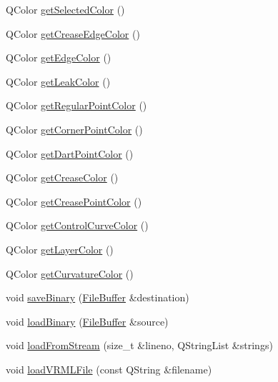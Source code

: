 \begin{DoxyCompactItemize}
Q\-Color \hyperlink{classShipCAD_1_1SubdivisionSurface_a4d307277e2a96d86b3d3e7788c2aac0a}{get\-Selected\-Color} ()
\item 
Q\-Color \hyperlink{classShipCAD_1_1SubdivisionSurface_a50b5868db7d2c5d6cce75fa2b52be60f}{get\-Crease\-Edge\-Color} ()
\item 
Q\-Color \hyperlink{classShipCAD_1_1SubdivisionSurface_a40dd77bdff5cf86b4a6eca7ff5a2e643}{get\-Edge\-Color} ()
\item 
Q\-Color \hyperlink{classShipCAD_1_1SubdivisionSurface_ac3131c3badeb6b11cb8a5ec5ceef0961}{get\-Leak\-Color} ()
\item 
Q\-Color \hyperlink{classShipCAD_1_1SubdivisionSurface_afdf406376421eb43a34f53392fbcf5b1}{get\-Regular\-Point\-Color} ()
\item 
Q\-Color \hyperlink{classShipCAD_1_1SubdivisionSurface_af64e951c070d6c88f70c399bc13809d1}{get\-Corner\-Point\-Color} ()
\item 
Q\-Color \hyperlink{classShipCAD_1_1SubdivisionSurface_ac355dfe572889755c24d1c8cd3145aea}{get\-Dart\-Point\-Color} ()
\item 
Q\-Color \hyperlink{classShipCAD_1_1SubdivisionSurface_a6aad1f3725f8033bb85403a01c252006}{get\-Crease\-Color} ()
\item 
Q\-Color \hyperlink{classShipCAD_1_1SubdivisionSurface_a82c8cb1c6c448be7554bcb42e0099660}{get\-Crease\-Point\-Color} ()
\item 
Q\-Color \hyperlink{classShipCAD_1_1SubdivisionSurface_a5b35353f739d224d8aa40ff19333ba98}{get\-Control\-Curve\-Color} ()
\item 
Q\-Color \hyperlink{classShipCAD_1_1SubdivisionSurface_a2a5e9c50d43e72829e02a8c0be31c260}{get\-Layer\-Color} ()
\item 
Q\-Color \hyperlink{classShipCAD_1_1SubdivisionSurface_aa39747141685b52d3987cf6c9f4e2aa8}{get\-Curvature\-Color} ()
\item 
void \hyperlink{classShipCAD_1_1SubdivisionSurface_a6e6254ecc6fcbdadf1ff4f646caa1d59}{save\-Binary} (\hyperlink{classShipCAD_1_1FileBuffer}{File\-Buffer} \&destination)
\item 
void \hyperlink{classShipCAD_1_1SubdivisionSurface_ac8ad644e0c19ac180fd4a7368fa410a6}{load\-Binary} (\hyperlink{classShipCAD_1_1FileBuffer}{File\-Buffer} \&source)
\item 
void \hyperlink{classShipCAD_1_1SubdivisionSurface_aa7aebfa4567458829323752a96195060}{load\-From\-Stream} (size\-\_\-t \&lineno, Q\-String\-List \&strings)
\item 
void \hyperlink{classShipCAD_1_1SubdivisionSurface_add8d612c82f170869f81042520f62499}{load\-V\-R\-M\-L\-File} (const Q\-String \&filename)

\end{DoxyCompactItemize}
